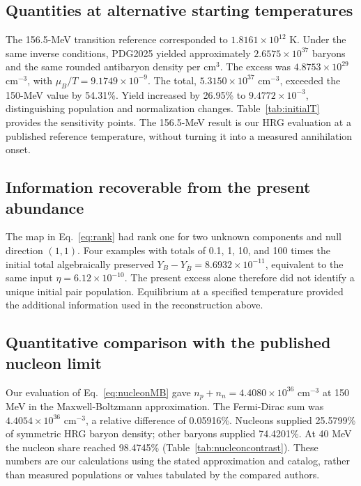 \subsection{Quantities at alternative starting temperatures}
The 156.5-MeV transition reference corresponded to $1.8161\times10^{12}$ K. Under the same inverse conditions, PDG2025 yielded approximately $2.6575\times10^{37}$ baryons and the same rounded antibaryon density per cm$^3$. The excess was $4.8753\times10^{29}$ cm$^{-3}$, with $\mu_B/T=9.1749\times10^{-9}$. The total, $5.3150\times10^{37}$ cm$^{-3}$, exceeded the 150-MeV value by 54.31\%. Yield increased by 26.95\% to $9.4772\times10^{-3}$, distinguishing population and normalization changes. Table~\ref{tab:initialT} provides the sensitivity points. The 156.5-MeV result is our HRG evaluation at a published reference temperature, without turning it into a measured annihilation onset.



\subsection{Information recoverable from the present abundance}
The map in Eq.~\eqref{eq:rank} had rank one for two unknown components and null direction $(1,1)$. Four examples with totals of 0.1, 1, 10, and 100 times the initial total algebraically preserved $Y_B-Y_{\bar B}=8.6932\times10^{-11}$, equivalent to the same input $\eta=6.12\times10^{-10}$. The present excess alone therefore did not identify a unique initial pair population. Equilibrium at a specified temperature provided the additional information used in the reconstruction above.

\subsection{Quantitative comparison with the published nucleon limit}
Our evaluation of Eq.~\eqref{eq:nucleonMB} gave $n_p+n_n=4.4080\times10^{36}$ cm$^{-3}$ at 150 MeV in the Maxwell-Boltzmann approximation. The Fermi-Dirac sum was $4.4054\times10^{36}$ cm$^{-3}$, a relative difference of 0.05916\%. Nucleons supplied 25.5799\% of symmetric HRG baryon density; other baryons supplied 74.4201\%. At 40 MeV the nucleon share reached 98.4745\% (Table~\ref{tab:nucleoncontrast}). These numbers are our calculations using the stated approximation and catalog, rather than measured populations or values tabulated by the compared authors.

